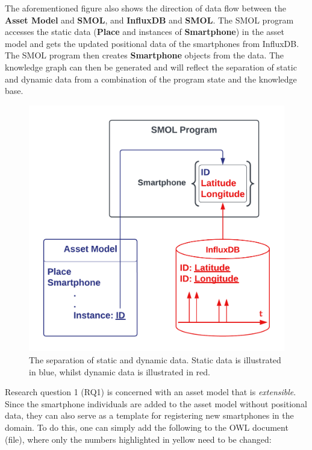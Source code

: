 \documentclass{article}
\begin{document}
The aforementioned figure also shows the direction of data flow between the \textbf{Asset Model} and \textbf{SMOL}, and \textbf{InfluxDB} and \textbf{SMOL}. The SMOL program accesses the static data (\textbf{Place} and instances of \textbf{Smartphone}) in the asset model and gets the updated positional data of the smartphones from InfluxDB. The SMOL program then creates \textbf{Smartphone} objects from the data. The knowledge graph can then be generated and will reflect the separation of static and dynamic data from a combination of the program state and the knowledge base.

\begin{figure}[H]
    \centering
    \includegraphics[scale=0.24]{graphics/static_dynamic_asset_model.png}
    \caption{The separation of static and dynamic data. Static data is illustrated in blue, whilst dynamic data is illustrated in red.}
    \label{fig:static_dynamic_asset_model}
\end{figure}

Research question 1 (RQ1) is concerned with an asset model that is \emph{extensible}. Since the smartphone individuals are added to the asset model without positional data, they can also serve as a template for registering new smartphones in the domain. To do this, one can simply add the following to the OWL document (file), where only the numbers highlighted in yellow need to be changed:
\end{document}
